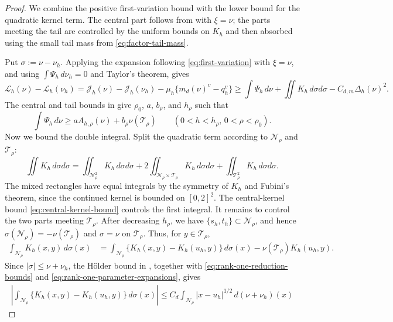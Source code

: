\begin{proof}
We combine the positive first-variation bound with the lower bound for the
quadratic kernel term.  The central part follows from
 with $\xi=\nu$; the parts meeting the
tail are controlled by the uniform bounds on $K_h$ and then absorbed using the
small tail mass from \eqref{eq:factor-tail-mass}.

Put $\sigma:=\nu-\nu_h$.  Applying the expansion following
\eqref{eq:first-variation} with $\xi=\nu$, and using
$\int \Psi_h\,d\nu_h=0$ and Taylor's theorem, gives
\begin{equation*}
  \mathcal L_h(\nu)-\mathcal L_h(\nu_h)
  =\mathcal J_h(\nu)-\mathcal J_h(\nu_h)
    -\mu_h\{m_d(\nu)^v-q_h^v\}
  \ge\int\Psi_h\,d\nu+\iint K_h\,d\sigma d\sigma
    -C_{d,m}\Delta_h(\nu)^2.
\end{equation*}
The central and tail bounds in 
give $\rho_0$, $a$, $b_\rho$, and $h_\rho$ such that
\[
  \int\Psi_h\,d\nu
  \ge a A_{h,\rho}(\nu)+b_\rho\nu(\mathcal T_\rho)
  \qquad
  (0<h<h_\rho,\, 0<\rho<\rho_0).
\]
Now we bound the double integral.  Split the quadratic term according to
$\mathcal N_\rho$ and $\mathcal T_\rho$:
\[
  \iint K_h\,d\sigma d\sigma
  =\iint_{\mathcal N_\rho^2}K_h\,d\sigma d\sigma
   +2\iint_{\mathcal N_\rho\times\mathcal T_\rho}K_h\,d\sigma d\sigma
   +\iint_{\mathcal T_\rho^2}K_h\,d\sigma d\sigma .
\]
The mixed rectangles have equal integrals by the symmetry of $K_h$ and
Fubini's theorem, since the continued kernel is bounded on $[0,2]^2$.
The central-kernel bound \eqref{eq:central-kernel-bound} controls the
first integral.  It remains to control the two parts meeting
$\mathcal T_\rho$.
After decreasing $h_\rho$, we have
$\{s_h,t_h\}\subset\mathcal N_\rho$, and hence
$\sigma(\mathcal N_\rho)=-\nu(\mathcal T_\rho)$ and $\sigma=\nu$ on
$\mathcal T_\rho$.  Thus, for $y\in\mathcal T_\rho$,
\[
\begin{aligned}
  \int_{\mathcal N_\rho}K_h(x,y)\,d\sigma(x)
  &=\int_{\mathcal N_\rho}
    \{K_h(x,y)-K_h(u_h,y)\}\,d\sigma(x)
    -\nu(\mathcal T_\rho) K_h(u_h,y).
\end{aligned}
\]
Since $|\sigma|\le\nu+\nu_h$, the H\"older bound in
, together with
\eqref{eq:rank-one-reduction-bounds} and
\eqref{eq:rank-one-parameter-expansions}, gives
\begin{equation*}
\begin{aligned}
  \left|\int_{\mathcal N_\rho}
    \{K_h(x,y)-K_h(u_h,y)\}\,d\sigma(x)\right|
  \le C_d\int_{\mathcal N_\rho}|x-u_h|^{1/2}\,d(\nu+\nu_h)(x)

\end{aligned}
\end{equation*}
\end{proof}
